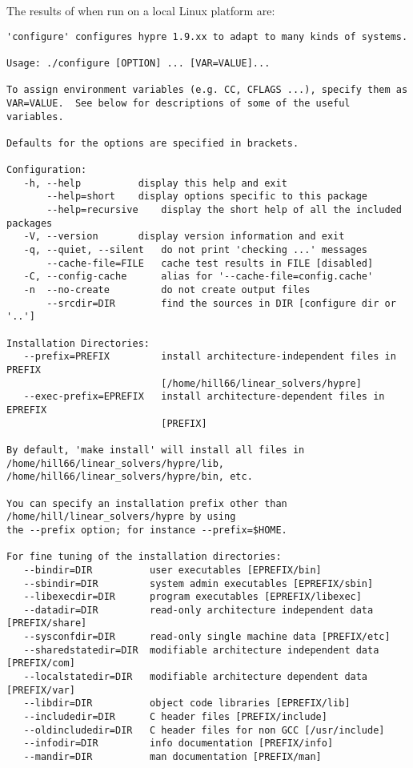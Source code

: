 The results of  when run on a local Linux platform are:
\begin{verbatim}
'configure' configures hypre 1.9.xx to adapt to many kinds of systems.

Usage: ./configure [OPTION] ... [VAR=VALUE]...

To assign environment variables (e.g. CC, CFLAGS ...), specify them as
VAR=VALUE.  See below for descriptions of some of the useful variables.

Defaults for the options are specified in brackets.

Configuration:
   -h, --help		   display this help and exit
       --help=short	   display options specific to this package
       --help=recursive	   display the short help of all the included packages
   -V, --version	   display version information and exit
   -q, --quiet, --silent   do not print 'checking ...' messages
       --cache-file=FILE   cache test results in FILE [disabled]
   -C, --config-cache      alias for '--cache-file=config.cache'
   -n  --no-create         do not create output files
       --srcdir=DIR        find the sources in DIR [configure dir or '..']

Installation Directories:
   --prefix=PREFIX         install architecture-independent files in PREFIX
                           [/home/hill66/linear_solvers/hypre]
   --exec-prefix=EPREFIX   install architecture-dependent files in EPREFIX 
                           [PREFIX]

By default, 'make install' will install all files in
/home/hill66/linear_solvers/hypre/lib, /home/hill66/linear_solvers/hypre/bin, etc.

You can specify an installation prefix other than /home/hill/linear_solvers/hypre by using 
the --prefix option; for instance --prefix=$HOME.

For fine tuning of the installation directories:
   --bindir=DIR          user executables [EPREFIX/bin]
   --sbindir=DIR         system admin executables [EPREFIX/sbin]
   --libexecdir=DIR      program executables [EPREFIX/libexec]
   --datadir=DIR         read-only architecture independent data [PREFIX/share]
   --sysconfdir=DIR      read-only single machine data [PREFIX/etc]
   --sharedstatedir=DIR  modifiable architecture independent data [PREFIX/com]
   --localstatedir=DIR   modifiable architecture dependent data [PREFIX/var]
   --libdir=DIR          object code libraries [EPREFIX/lib]
   --includedir=DIR      C header files [PREFIX/include]
   --oldincludedir=DIR   C header files for non GCC [/usr/include]
   --infodir=DIR         info documentation [PREFIX/info]
   --mandir=DIR          man documentation [PREFIX/man]


\end{verbatim}
